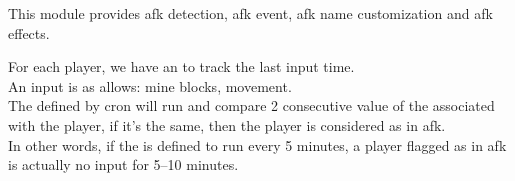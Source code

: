 

This module provides afk detection, afk event, afk name customization and afk effects.

For each player, we have an  to track the last input time.\\
An input is as allows: mine blocks, movement.\\
The  defined by cron will run and compare 2 consecutive value of the  associated with the player, if it's the same, then the player is considered as in afk.\\
In other words, if the  is defined to run every 5 minutes, a player flagged as in afk is actually no input for 5--10 minutes.



